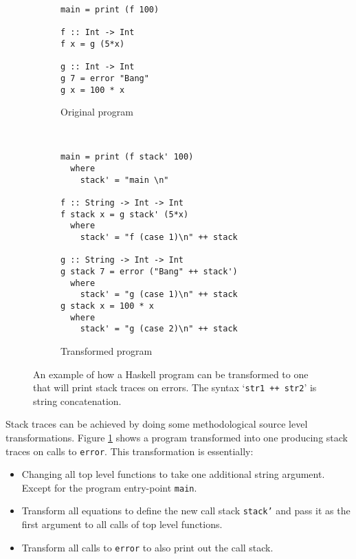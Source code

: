 \begin{figure}
\begin{mdframed}
        \begin{subfigure}[t]{0.4\textwidth}
            \begin{verbatim}
main = print (f 100)

f :: Int -> Int
f x = g (5*x)

g :: Int -> Int
g 7 = error "Bang"
g x = 100 * x
            \end{verbatim}
            \caption{Original program}
        \end{subfigure}
        ~ %
        \begin{subfigure}[t]{0.6\textwidth}
          \begin{verbatim}
main = print (f stack' 100)
  where
    stack' = "main \n"

f :: String -> Int -> Int
f stack x = g stack' (5*x)
  where
    stack' = "f (case 1)\n" ++ stack

g :: String -> Int -> Int
g stack 7 = error ("Bang" ++ stack')
  where
    stack' = "g (case 1)\n" ++ stack
g stack x = 100 * x
  where
    stack' = "g (case 2)\n" ++ stack
          \end{verbatim}
          \caption{Transformed program}
        \end{subfigure}
        \caption{An example of how a Haskell program can be transformed to one
          that will print stack traces on errors. The syntax `\texttt{str1 ++
            str2}' is string concatenation.
        }\label{fig:transformation}
\end{mdframed}
\end{figure}

Stack traces can be achieved by doing some methodological source level
transformations. Figure \ref{fig:transformation} shows a program transformed
into one producing stack traces on calls to \texttt{error}. This transformation is essentially:

\begin{itemize}
\itemsep1pt\parskip0pt
\item
  Changing all top level functions to take one additional string
  argument. Except for the program entry-point \texttt{main}.
\item
  Transform all equations to define the new call stack \texttt{stack'} and
  pass it as the first argument to all calls of top level functions.
\item
  Transform all calls to \texttt{error} to also print out the call stack.
\end{itemize}

